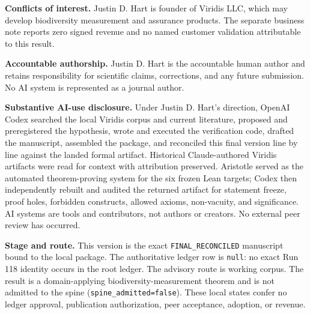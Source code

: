 \documentclass[10pt]{article}
\begin{document}
\textbf{Conflicts of interest.}  Justin D. Hart is founder of Viridis LLC,
which may develop biodiversity measurement and assurance products.  The
separate business note reports zero signed revenue and no named customer
validation attributable to this result.

\textbf{Accountable authorship.}  Justin D. Hart is the accountable human
author and retains responsibility for scientific claims, corrections, and any
future submission.  No AI system is represented as a journal author.

\textbf{Substantive AI-use disclosure.}  Under Justin D. Hart's direction,
OpenAI Codex searched the local Viridis corpus and current literature, proposed
and preregistered the hypothesis, wrote and executed the verification code,
drafted the manuscript, assembled the package, and reconciled this final version
line by line against the landed formal artifact.  Historical Claude-authored
Viridis artifacts were read for context with attribution preserved.  Aristotle
served as the automated theorem-proving system for the six frozen Lean targets;
Codex then independently rebuilt and audited the returned artifact for statement
freeze, proof holes, forbidden constructs, allowed axioms, non-vacuity, and
significance.  AI systems are tools and contributors, not authors or creators.
No external peer review has occurred.

\textbf{Stage and route.}  This version is the exact
\texttt{FINAL\_RECONCILED} manuscript bound to the local package.
The authoritative ledger row is \texttt{null}: no exact Run 118 identity occurs
in the root ledger.  The advisory route is working corpus.  The result is a
domain-applying biodiversity-measurement theorem and is not admitted to the
spine (\texttt{spine\_admitted=false}).  These local states confer no ledger
approval, publication authorization, peer acceptance, adoption, or revenue.
\end{document}

